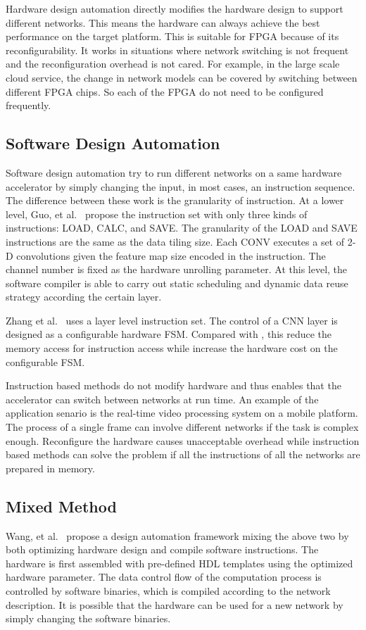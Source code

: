 Hardware design automation directly modifies the hardware design to support different networks. This means the hardware can always achieve the best performance on the target platform. This is suitable for FPGA because of its reconfigurability. It works in situations where network switching is not frequent and the reconfiguration overhead is not cared. For example, in the large scale cloud service, the change in network models can be covered by switching between different FPGA chips. So each of the FPGA do not need to be configured frequently.

\subsection{Software Design Automation}

Software design automation try to run different networks on a same hardware accelerator by simply changing the input, in most cases, an instruction sequence. The difference between these work is the granularity of instruction. At a lower level, Guo, et al.~\cite{guo2017angel} propose the instruction set with only three kinds of instructions: LOAD, CALC, and SAVE. The granularity of the LOAD and SAVE instructions are the same as the data tiling size. Each CONV executes a set of 2-D convolutions given the feature map size encoded in the instruction. The channel number is fixed as the hardware unrolling parameter. At this level, the software compiler is able to carry out static scheduling and dynamic data reuse strategy according the certain layer. 

Zhang et al.~\cite{zhang2016caffeine} uses a layer level instruction set. The control of a CNN layer is designed as a configurable hardware FSM. Compared with \cite{guo2017angel}, this reduce the memory access for instruction access while increase the hardware cost on the configurable FSM.

Instruction based methods do not modify hardware and thus enables that the accelerator can switch between networks at run time. An example of the application senario is the real-time video processing system on a mobile platform. The process of a single frame can involve different networks if the task is complex enough. Reconfigure the hardware causes unacceptable overhead while instruction based methods can solve the problem if all the instructions of all the networks are prepared in memory. 

\subsection{Mixed Method}
Wang, et al.~\cite{wang2016deepburning} propose a design automation framework mixing the above two by both optimizing hardware design and compile software instructions. The hardware is first assembled with pre-defined HDL templates using the optimized hardware parameter. The data control flow of the computation process is controlled by software binaries, which is compiled according to the network description. It is possible that the hardware can be used for a new network by simply changing the software binaries. 

